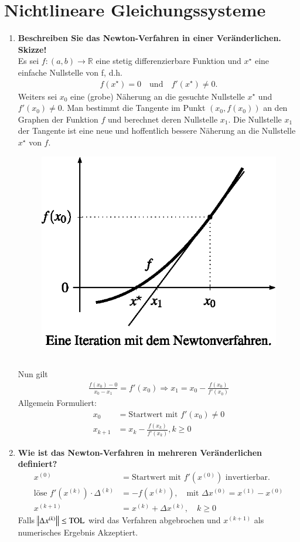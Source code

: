 \section{Nichtlineare Gleichungssysteme}
	\begin{enumerate}
		\item \textbf{Beschreiben Sie das Newton-Verfahren in einer Veränderlichen. Skizze!} \\
			Es sei \(f:(a,b)\rightarrow\mathbb{R}\) eine stetig differenzierbare Funktion und \(x^\star\) eine einfache Nullstelle von f, d.h.
			\begin{align*}
				f(x^\star)=0 \quad \text{und} \quad f'(x^\star)\neq 0.
			\end{align*}
			Weiters sei \(x_0\) eine (grobe) Näherung an die gesuchte Nullstelle \(x^\star\) und \(f'(x_0)\neq 0\).
			Man bestimmt die Tangente im Punkt \((x_0,f(x_0))\) an den Graphen der Funktion \(f\) und berechnet deren Nullstelle \(x_1\). Die Nullstelle \(x_1\) der Tangente ist eine neue und hoffentlich bessere Näherung an die Nullstelle \(x^\star\) von \(f\).
			\begin{figure}[htbp]
				\centering
				\includegraphics[width=0.35\linewidth]{Kap6_1}
			\end{figure}\\
			Nun gilt 
			\begin{align*}
				\frac{f(x_0)-0}{x_0-x_1}=f'(x_0) \Rightarrow x_1=x_0-\frac{f(x_0)}{f'(x_0)}
			\end{align*}
			Allgemein Formuliert:
			\begin{align*}
				x_0 &= \text{Startwert mit } f'(x_0)\neq 0 \\
				x_{k+1} &= x_k-\frac{f(x_k)}{f'(x_k)}, k\geq0
			\end{align*}
		\item \textbf{Wie ist das Newton-Verfahren in mehreren Veränderlichen definiert?}
			\begin{align*}
				x^{(0)} &= \text{Startwert mit } f'(x^{(0)}) \text{ invertierbar.} \\
				\text{löse } f'(x^{(k)})\cdot \Delta^{(k)} &= -f(x^{(k)}), \quad \text{mit } \Delta x^{(0)}=x^{(1)}-x^{(0)} \\
				x^{(k+1)} &= x^{(k)} +  \Delta x^{(k)}, \quad k\geq 0
			\end{align*}
			Falls \(\norm{\Delta x^{(k)}}\leq\text{TOL} \) wird das Verfahren abgebrochen und \(x^{(k+1)}\) als numerisches Ergebnis Akzeptiert.
		

\end{enumerate}
